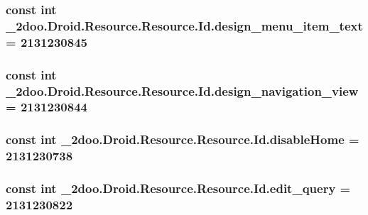\hypertarget{class__2doo_1_1_droid_1_1_resource_1_1_id_023d5fadb3fdb5cf94d2cda935bf6db0}{
\subsubsection[{design\_\-menu\_\-item\_\-text}]{\setlength{\rightskip}{0pt plus 5cm}const int \_\-2doo.Droid.Resource.Resource.Id.design\_\-menu\_\-item\_\-text = 2131230845}}
\label{class__2doo_1_1_droid_1_1_resource_1_1_id_023d5fadb3fdb5cf94d2cda935bf6db0}


\hypertarget{class__2doo_1_1_droid_1_1_resource_1_1_id_78253f90359a2251011f3c63dbaafdc2}{
\subsubsection[{design\_\-navigation\_\-view}]{\setlength{\rightskip}{0pt plus 5cm}const int \_\-2doo.Droid.Resource.Resource.Id.design\_\-navigation\_\-view = 2131230844}}
\label{class__2doo_1_1_droid_1_1_resource_1_1_id_78253f90359a2251011f3c63dbaafdc2}


\hypertarget{class__2doo_1_1_droid_1_1_resource_1_1_id_a862f7edab50e0c4ab582b001e5620f3}{
\subsubsection[{disableHome}]{\setlength{\rightskip}{0pt plus 5cm}const int \_\-2doo.Droid.Resource.Resource.Id.disableHome = 2131230738}}
\label{class__2doo_1_1_droid_1_1_resource_1_1_id_a862f7edab50e0c4ab582b001e5620f3}


\hypertarget{class__2doo_1_1_droid_1_1_resource_1_1_id_6cd6115121bd4e8958670444eb40b641}{
\subsubsection[{edit\_\-query}]{\setlength{\rightskip}{0pt plus 5cm}const int \_\-2doo.Droid.Resource.Resource.Id.edit\_\-query = 2131230822}}
\label{class__2doo_1_1_droid_1_1_resource_1_1_id_6cd6115121bd4e8958670444eb40b641}



